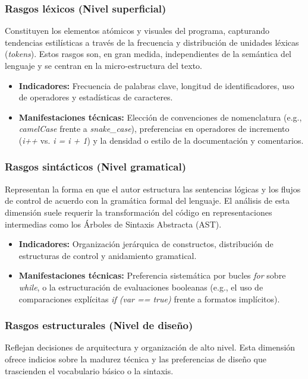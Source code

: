 \subsubsection{Rasgos léxicos (Nivel superficial)}
Constituyen los elementos atómicos y visuales del programa, capturando tendencias estilísticas a través de la frecuencia y distribución de unidades léxicas (\textit{tokens}). Estos rasgos son, en gran medida, independientes de la semántica del lenguaje y se centran en la micro-estructura del texto.

\begin{itemize}
    \item \textbf{Indicadores:} Frecuencia de palabras clave, longitud de identificadores, uso de operadores y estadísticas de caracteres.
    \item \textbf{Manifestaciones técnicas:} Elección de convenciones de nomenclatura (e.g., \textit{camelCase} frente a \textit{snake\_case}), preferencias en operadores de incremento (\textit{i++} vs. \textit{i = i + 1}) y la densidad o estilo de la documentación y comentarios.
\end{itemize}

\subsubsection{Rasgos sintácticos (Nivel gramatical)}
Representan la forma en que el autor estructura las sentencias lógicas y los flujos de control de acuerdo con la gramática formal del lenguaje. El análisis de esta dimensión suele requerir la transformación del código en representaciones intermedias como los Árboles de Sintaxis Abstracta (AST).

\begin{itemize}
    \item \textbf{Indicadores:} Organización jerárquica de constructos, distribución de estructuras de control y anidamiento gramatical.
    \item \textbf{Manifestaciones técnicas:} Preferencia sistemática por bucles \textit{for} sobre \textit{while}, o la estructuración de evaluaciones booleanas (e.g., el uso de comparaciones explícitas \textit{if (var == true)} frente a formatos implícitos).
\end{itemize}

\subsubsection{Rasgos estructurales (Nivel de diseño)}
Reflejan decisiones de arquitectura y organización de alto nivel. Esta dimensión ofrece indicios sobre la madurez técnica y las preferencias de diseño que trascienden el vocabulario básico o la sintaxis.

